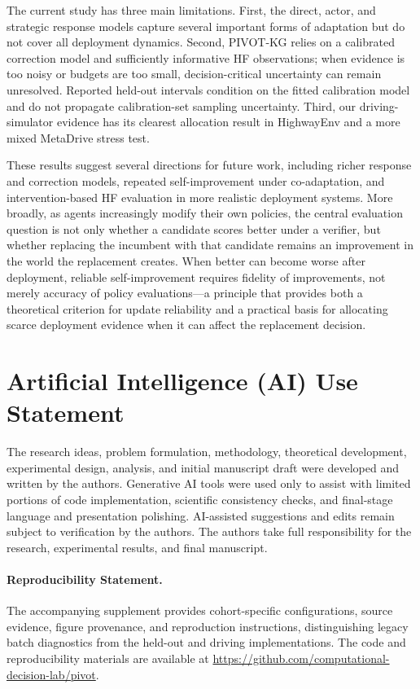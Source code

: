 \documentclass{article}
\begin{document}
The current study has three main limitations. First, the direct, actor, and
strategic response models capture several important forms of adaptation but do
not cover all deployment dynamics. Second, PIVOT-KG relies on a calibrated
correction model and sufficiently informative HF observations; when evidence
is too noisy or budgets are too small, decision-critical uncertainty can
remain unresolved. Reported held-out intervals condition on the fitted calibration
model and do not propagate calibration-set sampling uncertainty. Third, our
driving-simulator evidence has its clearest allocation result in HighwayEnv
and a more mixed MetaDrive stress test.

These results suggest several directions for future work, including richer
response and correction models, repeated self-improvement under co-adaptation,
and intervention-based HF evaluation in more realistic deployment systems. More
broadly, as agents increasingly modify their own policies, the central
evaluation question is not only whether a candidate scores better under a
verifier, but whether replacing the incumbent with that candidate remains an
improvement in the world the replacement creates. When better can become worse
after deployment, reliable self-improvement requires fidelity of improvements,
not merely accuracy of policy evaluations---a principle that provides both a
theoretical criterion for update reliability and a practical basis for allocating
scarce deployment evidence when it can affect the replacement decision.


\section*{Artificial Intelligence (AI) Use Statement}
The research ideas, problem formulation, methodology, theoretical development,
experimental design, analysis, and initial manuscript draft were developed and
written by the authors. Generative AI tools were used only to assist with
limited portions of code implementation, scientific consistency checks,
and final-stage language and presentation polishing. AI-assisted suggestions
and edits remain subject to verification by the authors. The authors take full responsibility for
the research, experimental results, and final manuscript.

\paragraph{Reproducibility Statement.}
The accompanying supplement provides cohort-specific configurations, source
evidence, figure provenance, and reproduction instructions, distinguishing
legacy batch diagnostics from the held-out and driving implementations.
The code and reproducibility materials are available at
\url{https://github.com/computational-decision-lab/pivot}.
\end{document}
